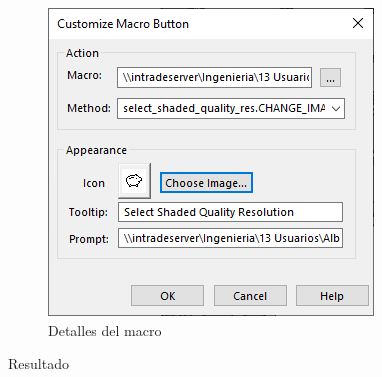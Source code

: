 \documentclass{report}
\begin{document}
\begin{figure}[H]
	\centering
	\includegraphics[width=0.55\linewidth, height=0.5\textheight,keepaspectratio]{Imagenes/solidworks_macro_14}
	\caption{Detalles del macro}
	\label{fig:solidworksmacro14}
\end{figure}

{\LARGE Resultado}
\end{document}
